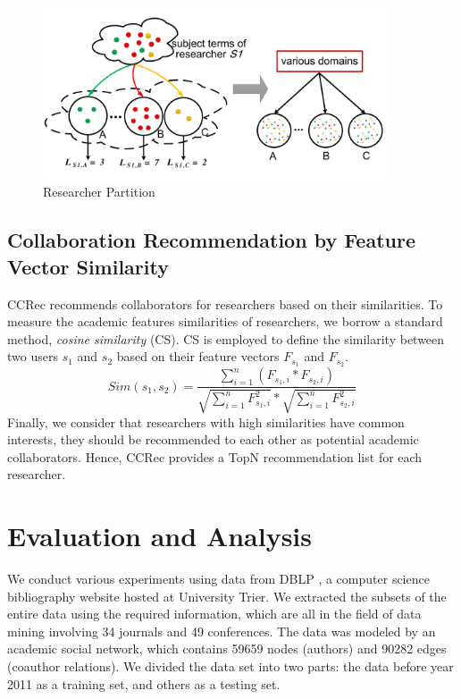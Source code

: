 \documentclass[review]{elsarticle}
\begin{document}
\begin{figure}
\centering
\includegraphics [width=4in]{Fig5.pdf}
\caption{Researcher Partition}
\end{figure}

\subsection{Collaboration Recommendation by Feature Vector Similarity}
CCRec recommends collaborators for researchers based on their similarities. To measure the academic features similarities of researchers, we borrow a standard method, \emph{cosine similarity} (CS). CS is employed to define the similarity between two users $s_{1}$ and $s_{2}$ based on their feature vectors $F_{s_{1}}$ and $F_{s_{2}}$.
\begin{equation}
Sim(s_{1},s_{2})=\frac{\sum_{i=1}^{n}(F_{s_{1},i}*F_{s_{2},i})}{\sqrt{\sum_{i=1}^{n}F_{s_{1},i}^2}*\sqrt{\sum_{i=1}^{n}F_{s_{2},i}^2}}
\end{equation}
Finally, we consider that researchers with high similarities have common interests, they should be recommended to each other as potential academic collaborators. Hence, CCRec provides a TopN recommendation list for each researcher.

\section{Evaluation and Analysis}
We conduct various experiments using data from DBLP \cite{Ley:DBLP}, a computer science bibliography website hosted at University Trier. We extracted the subsets of the entire data using the required information, which are all in the field of data mining involving 34 journals and 49 conferences. The data was modeled by an academic social network, which contains 59659 nodes (authors) and 90282 edges (coauthor relations). We divided the data set into two parts: the data before year 2011 as a training set, and others as a testing set.
\end{document}
